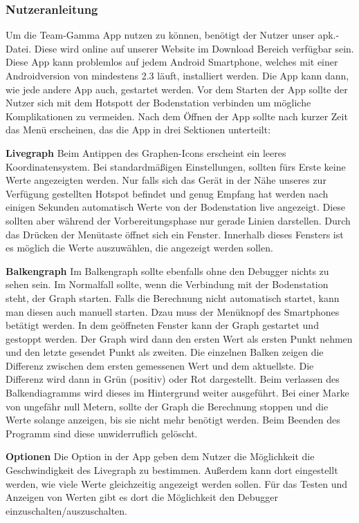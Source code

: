 \subsubsection{Nutzeranleitung}
Um die Team-Gamma App nutzen zu können, benötigt der Nutzer unser apk.-Datei. Diese wird online auf unserer Website im Download Bereich verfügbar sein. Diese App kann problemlos auf jedem Android Smartphone, welches mit einer Androidversion von mindestens 2.3 läuft, installiert werden. Die App kann dann, wie jede andere App auch, gestartet werden. Vor dem Starten der App sollte der Nutzer sich mit dem Hotspott der Bodenstation verbinden um mögliche Komplikationen zu vermeiden. Nach dem Öffnen der App sollte nach kurzer Zeit das Menü erscheinen, das die App in drei Sektionen unterteilt: 

\begin{description}
	\item \textbf{Livegraph}
	Beim Antippen des Graphen-Icons erscheint ein leeres Koordinatensystem. Bei standardmäßigen Einstellungen, sollten fürs Erste keine Werte angezeigten werden. Nur falls sich das Gerät in der Nähe unseres zur Verfügung gestellten Hotspot befindet und genug Empfang hat werden nach einigen Sekunden automatisch Werte von der Bodenstation live angezeigt. Diese sollten aber während der Vorbereitungsphase nur gerade Linien darstellen. Durch das Drücken der Menütaste öffnet sich ein Fenster. Innerhalb dieses Fensters ist es möglich die Werte auszuwählen, die angezeigt werden sollen.
	
	\item \textbf{Balkengraph}
	Im Balkengraph sollte ebenfalls ohne den Debugger nichts zu sehen sein. Im Normalfall sollte, wenn die Verbindung mit der Bodenstation steht, der Graph starten. Falls die Berechnung nicht automatisch startet, kann man diesen auch manuell starten. Dzau muss der Menüknopf des Smartphones betätigt werden. In dem geöffneten Fenster kann der Graph gestartet und gestoppt werden. Der Graph wird dann den ersten Wert als ersten Punkt nehmen und den letzte gesendet Punkt als zweiten. Die einzelnen Balken zeigen die Differenz zwischen dem ersten gemessenen Wert und dem aktuellste. Die Differenz wird dann in Grün (positiv) oder Rot dargestellt. Beim verlassen des Balkendiagramms wird dieses im Hintergrund weiter ausgeführt. Bei einer Marke von ungefähr null Metern, sollte der Graph die Berechnung stoppen und die Werte solange anzeigen, bis sie nicht mehr benötigt werden. Beim Beenden des Programm sind diese unwiderruflich gelöscht.
	\item \textbf{Optionen}
	Die Option in der App geben dem Nutzer die Möglichkeit die Geschwindigkeit des Livegraph zu bestimmen. Außerdem kann dort eingestellt werden, wie viele Werte gleichzeitig angezeigt werden sollen. Für das Testen und Anzeigen von Werten gibt es dort die Möglichkeit den Debugger einzuschalten/auszuschalten.
	\end {description}